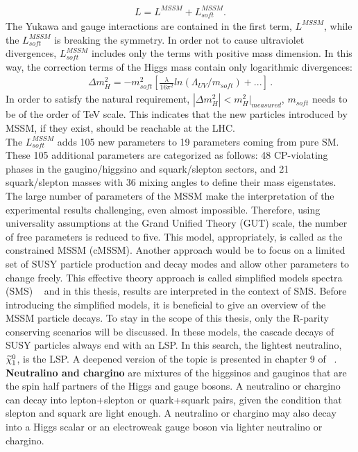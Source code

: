 \begin{eqnarray}
\label{Lsusy}
{L = L^{MSSM}+L^{MSSM}_{soft}}.
\end{eqnarray}
The Yukawa and gauge interactions are contained in the first term, $L^{MSSM}$, while the $L^{MSSM}_{soft}$ is breaking the symmetry.  In order not to cause ultraviolet divergences, $L^{MSSM}_{soft}$ includes only the terms with positive mass dimension. In this way, the correction terms of the Higgs mass contain only logarithmic divergences:
\begin{eqnarray}
\label{deltaH3}
{\Delta m_H^2 = -m^2_{soft}[ \frac{\lambda}{16\pi^2}ln(\Lambda_{UV}/m_{soft})+...]}\, .
\end{eqnarray}
In order to satisfy the natural requirement, $| \Delta m_H^2| < m_H^2|_{measured}$, $m_{soft}$ needs to be of the order of TeV scale. This indicates that the new particles introduced by MSSM, if they exist, should be reachable at the LHC. \\
The $L^{MSSM}_{soft}$ adds 105 new parameters to 19 parameters coming from pure SM. These 105 additional parameters are categorized as follows: 48 CP-violating phases in the gaugino/higgsino and squark/slepton sectors, and 21 squark/slepton masses with 36 mixing angles to define their mass eigenstates.\\
The large number of parameters of the MSSM make the interpretation of the experimental results challenging, even almost impossible.  Therefore, using universality assumptions at the Grand Unified Theory (GUT) scale, the number of free parameters is reduced to five. This model, appropriately, is called as the constrained MSSM (cMSSM). Another approach would be to focus on a limited set of SUSY particle production and decay modes and allow other parameters to change freely. This effective theory approach is called simplified models spectra (SMS) ~\cite{SMS} and in this thesis, results are interpreted in the context of SMS. Before introducing the simplified models, it is beneficial to give an overview of the MSSM particle decays. To stay in the scope of this thesis, only the R-parity conserving scenarios will be discussed. In these models, the cascade decays of SUSY particles always end with an LSP. In this search, the lightest neutralino, $ \widetilde{\chi}^0_1$, is the LSP. A deepened version of the topic is presented in chapter 9 of ~\cite{SUSY1}.
\\
\textbf{Neutralino and chargino} are mixtures of the higgsinos and gauginos that are the spin half partners of the Higgs and gauge bosons. A neutralino or chargino can decay into lepton+slepton or quark+squark pairs, given the condition that slepton and squark are light enough. A neutralino or chargino may also decay into a Higgs scalar or an electroweak gauge boson via lighter neutralino or chargino. 

